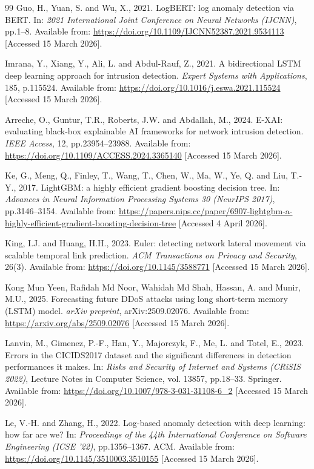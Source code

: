 \documentclass[12pt,a4paper]{report}
\begin{document}
\begin{thebibliography}{99}
Guo, H., Yuan, S. and Wu, X., 2021. LogBERT: log anomaly detection via BERT. In: \textit{2021 International Joint Conference on Neural Networks (IJCNN)}, pp.1--8. Available from: \url{https://doi.org/10.1109/IJCNN52387.2021.9534113} [Accessed 15 March 2026].

Imrana, Y., Xiang, Y., Ali, L. and Abdul-Rauf, Z., 2021. A bidirectional LSTM deep learning approach for intrusion detection. \textit{Expert Systems with Applications}, 185, p.115524. Available from: \url{https://doi.org/10.1016/j.eswa.2021.115524} [Accessed 15 March 2026].

Arreche, O., Guntur, T.R., Roberts, J.W. and Abdallah, M., 2024. E-XAI: evaluating black-box explainable AI frameworks for network intrusion detection. \textit{IEEE Access}, 12, pp.23954--23988. Available from: \url{https://doi.org/10.1109/ACCESS.2024.3365140} [Accessed 15 March 2026].

Ke, G., Meng, Q., Finley, T., Wang, T., Chen, W., Ma, W., Ye, Q. and Liu, T.-Y., 2017. LightGBM: a highly efficient gradient boosting decision tree. In: \textit{Advances in Neural Information Processing Systems 30 (NeurIPS 2017)}, pp.3146--3154. Available from: \url{https://papers.nips.cc/paper/6907-lightgbm-a-highly-efficient-gradient-boosting-decision-tree} [Accessed 4 April 2026].

King, I.J. and Huang, H.H., 2023. Euler: detecting network lateral movement via scalable temporal link prediction. \textit{ACM Transactions on Privacy and Security}, 26(3). Available from: \url{https://doi.org/10.1145/3588771} [Accessed 15 March 2026].

Kong Mun Yeen, Rafidah Md Noor, Wahidah Md Shah, Hassan, A. and Munir, M.U., 2025. Forecasting future DDoS attacks using long short-term memory (LSTM) model. \textit{arXiv preprint}, arXiv:2509.02076. Available from: \url{https://arxiv.org/abs/2509.02076} [Accessed 15 March 2026].

Lanvin, M., Gimenez, P.-F., Han, Y., Majorczyk, F., Me, L. and Totel, E., 2023. Errors in the CICIDS2017 dataset and the significant differences in detection performances it makes. In: \textit{Risks and Security of Internet and Systems (CRiSIS 2022)}, Lecture Notes in Computer Science, vol. 13857, pp.18--33. Springer. Available from: \url{https://doi.org/10.1007/978-3-031-31108-6_2} [Accessed 15 March 2026].

Le, V.-H. and Zhang, H., 2022. Log-based anomaly detection with deep learning: how far are we? In: \textit{Proceedings of the 44th International Conference on Software Engineering (ICSE '22)}, pp.1356--1367. ACM. Available from: \url{https://doi.org/10.1145/3510003.3510155} [Accessed 15 March 2026].


\end{thebibliography}
\end{document}
